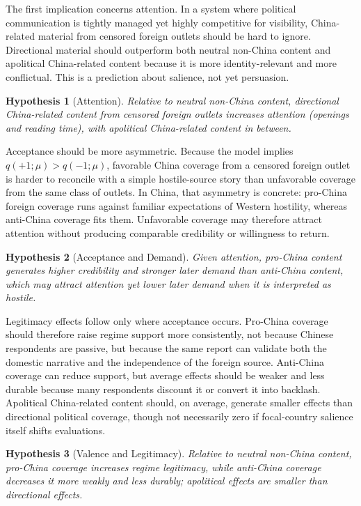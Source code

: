 \documentclass[12pt,american]{article}
\newtheorem{hypothesis}{Hypothesis}
\begin{document}
	The first implication concerns attention. In a system where political communication is tightly managed yet highly competitive for visibility, China-related material from censored foreign outlets should be hard to ignore. Directional material should outperform both neutral non-China content and apolitical China-related content because it is more identity-relevant and more conflictual. This is a prediction about salience, not yet persuasion.
	\begin{singlespace}
		\begin{hypothesis}[Attention]
			Relative to neutral non-China content, directional China-related content from censored foreign outlets increases attention (openings and reading time), with apolitical China-related content in between.
		\end{hypothesis}
	\end{singlespace}
	
	Acceptance should be more asymmetric. Because the model implies \(q(+1;\mu)>q(-1;\mu)\), favorable China coverage from a censored foreign outlet is harder to reconcile with a simple hostile-source story than unfavorable coverage from the same class of outlets. In China, that asymmetry is concrete: pro-China foreign coverage runs against familiar expectations of Western hostility, whereas anti-China coverage fits them. Unfavorable coverage may therefore attract attention without producing comparable credibility or willingness to return.
	\begin{singlespace}
		\begin{hypothesis}[Acceptance and Demand]
			Given attention, pro-China content generates higher credibility and stronger later demand than anti-China content, which may attract attention yet lower later demand when it is interpreted as hostile.
		\end{hypothesis}
	\end{singlespace}
	
	Legitimacy effects follow only where acceptance occurs. Pro-China coverage should therefore raise regime support more consistently, not because Chinese respondents are passive, but because the same report can validate both the domestic narrative and the independence of the foreign source. Anti-China coverage can reduce support, but average effects should be weaker and less durable because many respondents discount it or convert it into backlash. Apolitical China-related content should, on average, generate smaller effects than directional political coverage, though not necessarily zero if focal-country salience itself shifts evaluations.
	\begin{singlespace}
		\begin{hypothesis}[Valence and Legitimacy]
			Relative to neutral non-China content, pro-China coverage increases regime legitimacy, while anti-China coverage decreases it more weakly and less durably; apolitical effects are smaller than directional effects.
		\end{hypothesis}
	\end{singlespace}
	
\end{document}
